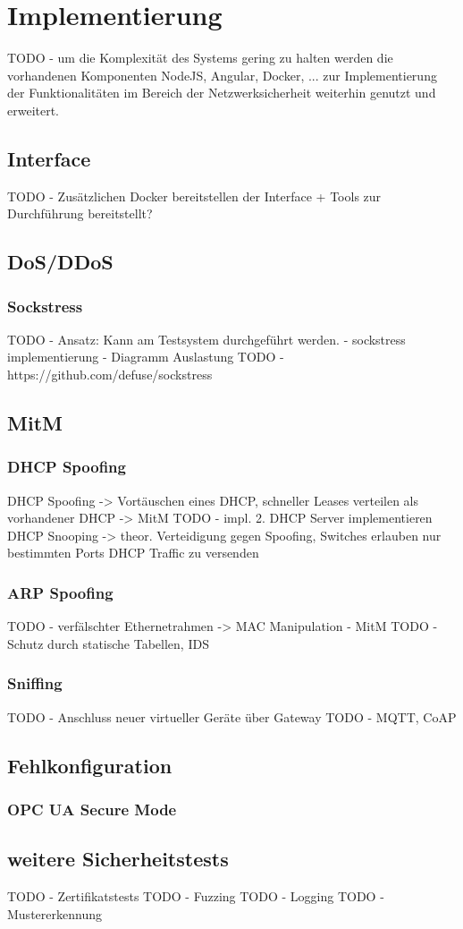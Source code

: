 \chapter{Implementierung}
TODO - um die Komplexität des Systems gering zu halten werden die vorhandenen Komponenten NodeJS, Angular, Docker, ... zur Implementierung der Funktionalitäten im Bereich der Netzwerksicherheit weiterhin genutzt und erweitert.

\section{Interface}
TODO - Zusätzlichen Docker bereitstellen der Interface + Tools zur Durchführung bereitstellt?

\section{\ac{DoS}/\ac{DDoS}}
\subsection{Sockstress}
\label{Impl:Sockstress}
TODO - Ansatz: Kann am Testsystem durchgeführt werden. - sockstress implementierung - Diagramm Auslastung
TODO - https://github.com/defuse/sockstress

\section{\ac{MitM}}
\subsection{\ac{DHCP} Spoofing}
\label{Impl:DHCP Spoofing}
DHCP Spoofing -> Vortäuschen eines DHCP, schneller Leases verteilen als vorhandener DHCP -> MitM
TODO - impl. 2. DHCP Server implementieren
DHCP Snooping -> theor. Verteidigung gegen Spoofing, Switches erlauben nur bestimmten Ports DHCP Traffic zu versenden

\subsection{\ac{ARP} Spoofing}
TODO - verfälschter Ethernetrahmen -> MAC Manipulation - MitM
TODO - Schutz durch statische Tabellen, \ac{IDS}

\subsection{Sniffing}
TODO - Anschluss neuer virtueller Geräte über Gateway
TODO - MQTT, CoAP

\section{Fehlkonfiguration}
\label{Impl:Fehlkonfiguration}
\subsection{OPC UA Secure Mode}

\section{weitere Sicherheitstests}
TODO - Zertifikatstests
TODO - Fuzzing
TODO - Logging
TODO - Mustererkennung